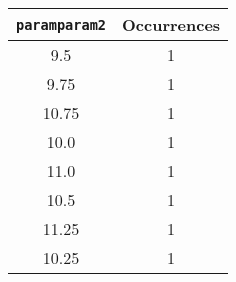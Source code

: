 \begin{longtable}{|c|c|}
\hline
\textbf{\texttt{paramparam2}} & \textbf{Occurrences} \\
\hline
9.5 & 1 \\
\hline
9.75 & 1 \\
\hline
10.75 & 1 \\
\hline
10.0 & 1 \\
\hline
11.0 & 1 \\
\hline
10.5 & 1 \\
\hline
11.25 & 1 \\
\hline
10.25 & 1 \\
\hline
\end{longtable}